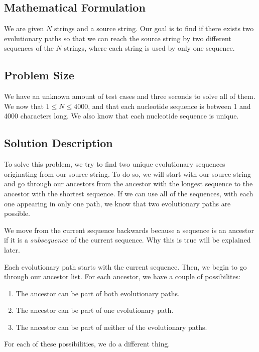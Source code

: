 \documentclass[12pt]{article}
\begin{document}
\subsection{Mathematical Formulation}

We are given $N$ strings and a source string. Our goal is
to find if there exists two evolutionary paths so that we
can reach the source string by two different sequences of
the $N$ strings, where each string is used by only one
sequence.

\subsection{Problem Size}

We have an unknown amount of test cases and three seconds to solve
all of them. We now that $1 \leq N \leq 4000$, and that each
nucleotide sequence is between 1 and 4000 characters long. We
also know that each nucleotide sequence is unique.

\subsection{Solution Description}

To solve this problem, we try to find two unique evolutionary
sequences originating from our source string. To do so,
we will start with our source string and go through our
ancestors from the ancestor with the longest sequence
to the ancestor with the shortest sequence. If we can
use all of the sequences, with each one appearing in only
one path, we know that two evolutionary paths are possible.

We move from the current sequence backwards because a sequence
is an ancestor if it is a $subsequence$ of the current sequence.
Why this is true will be explained later.

Each evolutionary path starts with the current sequence. Then,
we begin to go through our ancestor list. For each ancestor,
we have a couple of possibilites:

\begin{enumerate}
    \item The ancestor can be part of both evolutionary paths.
    \item The ancestor can be part of one evolutionary path.
    \item The ancestor can be part of neither of the evolutionary paths.
\end{enumerate}

\noindent For each of these possibilities, we do a different thing.
\end{document}
